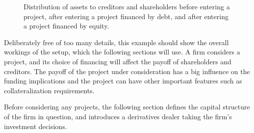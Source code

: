 \documentclass[main.tex]{subfiles}
\begin{document}
    \begin{figure}
        \centering
        \resizebox{\textwidth}{!}{%
        \begin{tikzpicture}
            
        \end{tikzpicture}        
        }   
        \caption{
            Distribution of assets to creditors and shareholders before entering a project,
            after entering a project financed by debt, 
            and after entering a project financed by equity.
        }
        \label{fig:funding-examples}
    \end{figure}

    Deliberately free of too many details, 
    this example should show the overall workings of the setup, 
    which the following sections will use.
    A firm considers a project, 
    and its choice of financing will affect the payoff of shareholders and creditors.
    The payoff of the project under consideration has a big influence on the funding implications
    and the project can have other important features such as collateralization requirements.

    Before considering any projects, 
    the following section defines the capital structure of the firm in question,
    and introduces a derivatives dealer taking the firm's investment decisions. 
\end{document}
